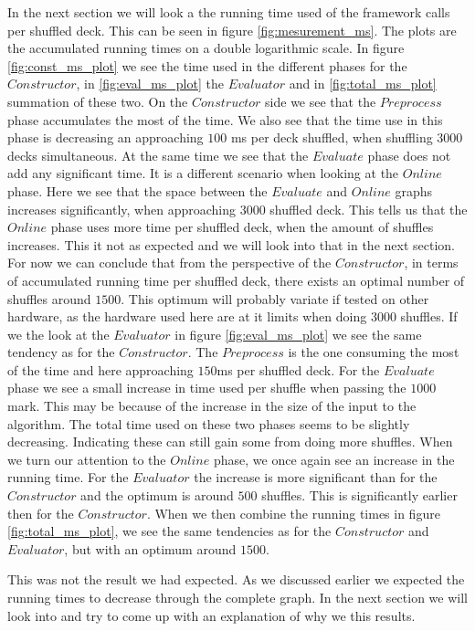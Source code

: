 \documentclass[twoside,11pt,openright]{report}
\begin{document}
In the next section we will look a the running time used of the framework calls per shuffled deck. This can be seen in figure \ref{fig:mesurement_ms}. The plots are the accumulated running times on a double logarithmic scale. In figure \ref{fig:const_ms_plot} we see the time used in the different phases for the $Constructor$, in \ref{fig:eval_ms_plot} the $Evaluator$ and in \ref{fig:total_ms_plot} summation of these two. On the $Constructor$ side we see that the $Preprocess$ phase accumulates the most of the time. We also see that the time use in this phase is decreasing an approaching $100$ ms per deck shuffled, when shuffling $3000$ decks simultaneous. At the same time we see that the $Evaluate$ phase does not add any significant time. It is a different scenario when looking at the $Online$ phase. Here we see that the space between the $Evaluate$ and $Online$ graphs increases significantly, when approaching $3000$ shuffled deck. This tells us that the $Online$ phase uses more time per shuffled deck, when the amount of shuffles increases. This it not as expected and we will look into that in the next section. For now we can conclude that from the perspective of the $Constructor$, in terms of accumulated running time per shuffled deck, there exists an optimal number of shuffles around $1500$. This optimum will probably variate if tested on other hardware, as the hardware used here are at it limits when doing $3000$ shuffles.
If we the look at the $Evaluator$ in figure \ref{fig:eval_ms_plot} we see the same tendency as for the $Constructor$. The $Preprocess$ is the one consuming the most of the time and here approaching $150$ms per shuffled deck. For the $Evaluate$ phase we see a small increase in time used per shuffle when passing the $1000$ mark. This may be because of the increase in the size of the input to the algorithm. The total time used on these two phases seems to be slightly decreasing. Indicating these can still gain some from doing more shuffles. When we turn our attention to the $Online$ phase, we once again see an increase in the running time. For the $Evaluator$ the increase is more significant than for the $Constructor$ and the optimum is around $500$ shuffles. This is significantly earlier then for the $Constructor$. When we then combine the running times in figure \ref{fig:total_ms_plot}, we see the same tendencies as for the $Constructor$ and $Evaluator$, but with an optimum around $1500$.

\bigskip

This was not the result we had expected. As we discussed earlier we expected the running times to decrease through the complete graph. In the next section we will look into and try to come up with an explanation of why we this results.
\end{document}
